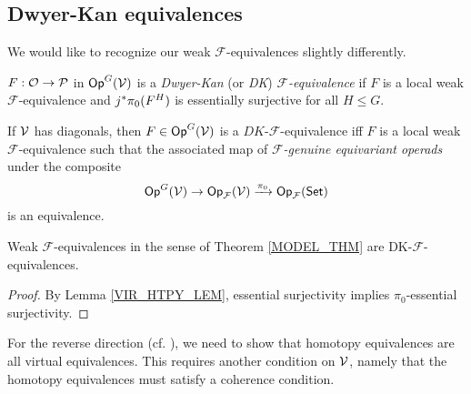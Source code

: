 \documentclass[a4paper,10pt
]{article}%
\renewcommand{\F}{\mathcal F}
\renewcommand{\1}{\ensuremath{\mathbb{id}}}
\begin{document}

\subsection{Dwyer-Kan equivalences}

We would like to recognize our weak $\F$-equivalences slightly differently.

\begin{definition}
      $F: \mathcal{O} \to \mathcal{P}$ in $\mathsf{Op}^G(\mathcal V)$ is a \textit{Dwyer-Kan} (or \textit{DK}) \textit{$\F$-equivalence} if
      $F$ is a local weak $\F$-equivalence and
      $j^{\**}\pi_0(F^H)$ is essentially surjective for all $H \leq G$.
\end{definition}

\begin{remark}
      If $\mathcal V$ has diagonals, then $F \in \mathsf{Op}^G(\mathcal V)$ is a $DK$-$\F$-equivalence iff
      $F$ is a local weak $\F$-equivalence such that 
      the associated map of \textit{$\F$-genuine equivariant operads} under the composite
      \begin{equation}
            \Op^G(\V) \to \Op_\F(\V) \xrightarrow{\pi_0} \Op_\F(\Set) 
      \end{equation}
      is an equivalence.
\end{remark}

\begin{proposition}
      \label{WE_ARE_DK_PROP}
      Weak $\F$-equivalences in the sense of Theorem \ref{MODEL_THM} are DK-$\F$-equivalences.
\end{proposition}
\begin{proof}
      By Lemma \ref{VIR_HTPY_LEM}, essential surjectivity implies $\pi_0$-essential surjectivity. 
\end{proof}


For the reverse direction (cf. \cite[\S 2]{BM13}), we need to show that
homotopy equivalences are all virtual equivalences.
This requires another condition on $\mathcal V$, namely that the homotopy equivalences must satisfy a coherence condition.
\end{document}

